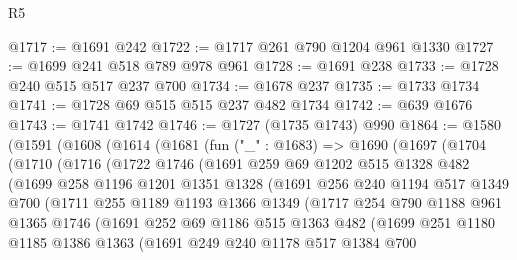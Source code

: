 \begin{lexlean}{R5}
\begin{coremodule}
@1717 := @1691 @242
@1722 := @1717 @261 @790 @1204 @961 @1330
@1727 := @1699 @241 @518 @789 @978 @961
@1728 := @1691 @238
@1733 := @1728 @240 @515 @517 @237 @700
@1734 := @1678 @237
@1735 := @1733 @1734
@1741 := @1728 @69 @515 @515 @237 @482 @1734
@1742 := @639 @1676
@1743 := @1741 @1742
@1746 := @1727 (@1735 @1743) @990
@1864 := @1580
    (@1591
      (@1608
        (@1614
          (@1681
            (fun ("_" : @1683) =>
            @1690
              (@1697
                (@1704
                  (@1710
                    (@1716
                      (@1722
                        @1746
                        (@1691
                          @259
                          @69
                          @1202
                          @515
                          @1328
                          @482
                          (@1699
                            @258
                            @1196
                            @1201
                            @1351
                            @1328
                            (@1691
                              @256
                              @240
                              @1194
                              @517
                              @1349
                              @700
                              (@1711
                                @255
                                @1189
                                @1193
                                @1366
                                @1349
                                (@1717
                                  @254
                                  @790
                                  @1188
                                  @961
                                  @1365
                                  @1746
                                  (@1691
                                    @252
                                    @69
                                    @1186
                                    @515
                                    @1363
                                    @482
                                    (@1699
                                      @251
                                      @1180
                                      @1185
                                      @1386
                                      @1363
                                      (@1691
                                        @249
                                        @240
                                        @1178
                                        @517
                                        @1384
                                        @700

\end{coremodule}
\end{lexlean}
